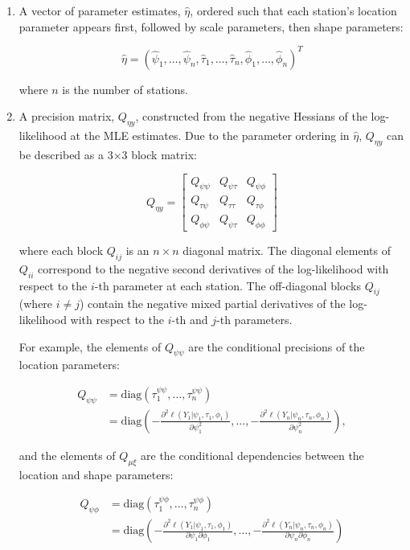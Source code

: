 \documentclass[
  letterpaper,
  DIV=11,
  numbers=noendperiod]{scrartcl}
\begin{document}
\begin{enumerate}
\def\labelenumi{\arabic{enumi}.}
\item
  A vector of parameter estimates, \(\hat\eta\), ordered such that each
  station's location parameter appears first, followed by scale
  parameters, then shape parameters:

  \[
  \hat{\eta} = (\hat{\psi}_1, \ldots, \hat{\psi}_n, \hat{\tau}_1, \ldots, \hat{\tau}_n, \hat{\phi}_1, \ldots, \hat{\phi}_n)^T
  \]

  where \(n\) is the number of stations.
\item
  A precision matrix, \(Q_{\eta y}\), constructed from the negative
  Hessians of the log-likelihood at the MLE estimates. Due to the
  parameter ordering in \(\hat\eta\), \(Q_{\eta y}\) can be described as
  a 3×3 block matrix:

  \[
  Q_{\eta y} = \begin{bmatrix}
  Q_{\psi\psi} & Q_{\psi\tau} & Q_{\psi\phi} \\
  Q_{\tau\psi} & Q_{\tau\tau} & Q_{\tau\phi} \\
  Q_{\phi\psi} & Q_{\psi\tau} & Q_{\phi\phi}
  \end{bmatrix}
  \]

  where each block \(Q_{ij}\) is an \(n \times n\) diagonal matrix. The
  diagonal elements of \(Q_{ii}\) correspond to the negative second
  derivatives of the log-likelihood with respect to the \(i\)-th
  parameter at each station. The off-diagonal blocks \(Q_{ij}\) (where
  \(i \neq j\)) contain the negative mixed partial derivatives of the
  log-likelihood with respect to the \(i\)-th and \(j\)-th parameters.

  For example, the elements of \(Q_{\psi\psi}\) are the conditional
  precisions of the location parameters:

  \[
  \begin{aligned}
  Q_{\psi\psi} &=  \text{diag}\left(\tau^{\psi\psi}_1, \dots, \tau^{\psi\psi}_n\right)\\
  &= \text{diag}\left(-\frac{\partial^2 \ell(Y_1|\psi_1,\tau_1,\phi_1)}{\partial \psi_1^2}, \ldots, -\frac{\partial^2 \ell(Y_n|\psi_n,\tau_n,\phi_n)}{\partial \psi_n^2}\right),
  \end{aligned}
  \]

  and the elements of \(Q_{\mu\xi}\) are the conditional dependencies
  between the location and shape parameters:

  \[
  \begin{aligned}
  Q_{\psi\phi} &= \text{diag}\left(\tau^{\psi\phi}_1, \dots, \tau^{\psi\phi}_n\right) \\
  &= \text{diag}\left(-\frac{\partial^2 \ell(Y_1|\psi_1,\tau_1,\phi_1)}{\partial \psi_1\partial \phi_1}, \ldots, -\frac{\partial^2 \ell(Y_n|\psi_n,\tau_n,\phi_n)}{\partial \psi_n\partial \phi_n}\right)
  \end{aligned}
  \]
\end{enumerate}
\end{document}
